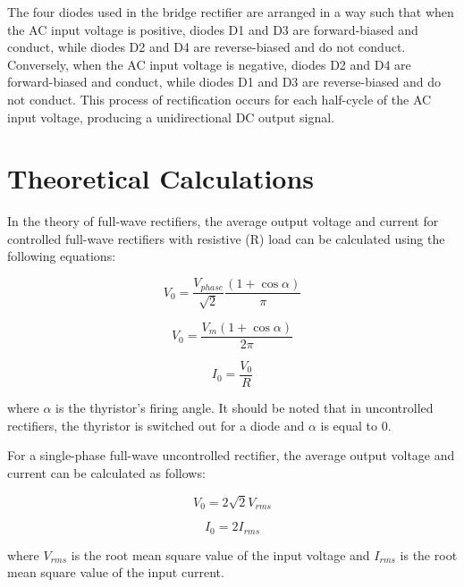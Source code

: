 The four diodes used in the bridge rectifier are arranged in a way such that when the AC input voltage is positive, diodes D1 and D3 are forward-biased and conduct, while diodes D2 and D4 are reverse-biased and do not conduct. Conversely, when the AC input voltage is negative, diodes D2 and D4 are forward-biased and conduct, while diodes D1 and D3 are reverse-biased and do not conduct. This process of rectification occurs for each half-cycle of the AC input voltage, producing a unidirectional DC output signal.


\section{Theoretical Calculations}
\hspace{\parindent}
In the theory of full-wave rectifiers, the average output voltage and current for controlled full-wave rectifiers with resistive (R) load can be calculated using the following equations:

\begin{equation}
    V_0 = \frac{V_{phase}}{\sqrt{2}}\frac{(1+\cos\alpha)}{\pi}
\end{equation}

\begin{equation}
    V_0 = \frac{V_m(1+\cos\alpha)}{2\pi}
\end{equation}

\begin{equation}
    I_0 = \frac{V_0}{R}
\end{equation}

where $\alpha$ is the thyristor's firing angle. It should be noted that in uncontrolled rectifiers, the thyristor is switched out for a diode and $\alpha$ is equal to 0.

For a single-phase full-wave uncontrolled rectifier, the average output voltage and current can be calculated as follows:

\begin{equation}
    V_0 = 2\sqrt{2}V_{rms}
\end{equation}

\begin{equation}
    I_0 = 2I_{rms}
\end{equation}

where $V_{rms}$ is the root mean square value of the input voltage and $I_{rms}$ is the root mean square value of the input current.

